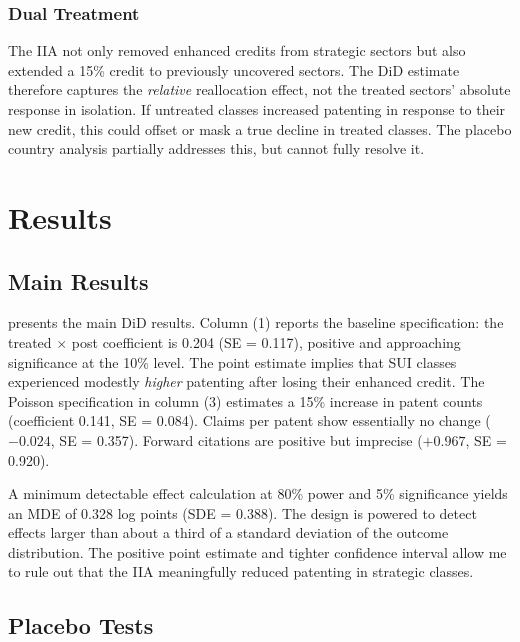 \documentclass[12pt]{article}
\begin{document}
\subsubsection*{Dual Treatment} The IIA not only removed enhanced credits from strategic sectors but also extended a 15\% credit to previously uncovered sectors. The DiD estimate therefore captures the \textit{relative} reallocation effect, not the treated sectors' absolute response in isolation. If untreated classes increased patenting in response to their new credit, this could offset or mask a true decline in treated classes. The placebo country analysis partially addresses this, but cannot fully resolve it.


\section{Results}

\subsection{Main Results}



 presents the main DiD results. Column (1) reports the baseline specification: the treated $\times$ post coefficient is 0.204 (SE = 0.117), positive and approaching significance at the 10\% level. The point estimate implies that SUI classes experienced modestly \textit{higher} patenting after losing their enhanced credit. The Poisson specification in column (3) estimates a 15\% increase in patent counts (coefficient 0.141, SE = 0.084). Claims per patent show essentially no change ($-0.024$, SE = 0.357). Forward citations are positive but imprecise ($+0.967$, SE = 0.920).

A minimum detectable effect calculation at 80\% power and 5\% significance yields an MDE of 0.328 log points (SDE = 0.388). The design is powered to detect effects larger than about a third of a standard deviation of the outcome distribution. The positive point estimate and tighter confidence interval allow me to rule out that the IIA meaningfully reduced patenting in strategic classes.

\subsection{Placebo Tests}


\end{document}

